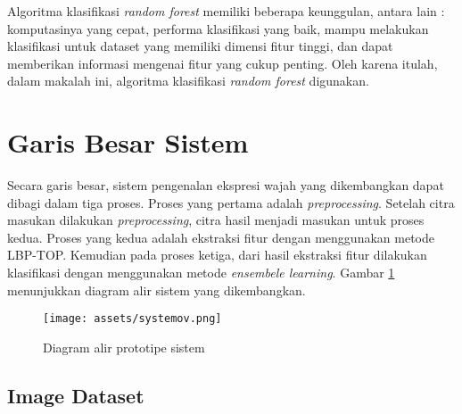 \documentclass[review,3p,12pt,times]{elsarticle}
\begin{document}
Algoritma klasifikasi \textit{random forest} memiliki beberapa keunggulan, antara lain \cite{breimanonline}: komputasinya yang cepat, performa klasifikasi yang baik, mampu melakukan klasifikasi untuk dataset yang memiliki dimensi fitur tinggi,
dan dapat memberikan informasi mengenai fitur yang cukup penting. Oleh karena itulah, dalam makalah ini, algoritma klasifikasi \textit{random forest} digunakan.




\section{Garis Besar Sistem}
\label{bigsystem}

Secara garis besar, sistem pengenalan ekspresi wajah yang dikembangkan dapat dibagi dalam tiga proses. Proses yang pertama adalah \textit{preprocessing}. Setelah citra masukan dilakukan \textit{preprocessing}, citra hasil menjadi masukan untuk proses kedua. Proses yang kedua adalah ekstraksi fitur dengan menggunakan metode LBP-TOP. Kemudian pada proses ketiga, dari hasil ekstraksi fitur dilakukan klasifikasi dengan menggunakan metode \textit{ensembele learning}. Gambar \ref{fig:systemov} menunjukkan diagram alir sistem yang dikembangkan.

\begin{figure}[hbt!]
\caption{Diagram alir prototipe sistem}
\label{fig:systemov}
\centering
	\texttt{[image: assets/systemov.png]}
	
\end{figure}

\subsection{Image Dataset}
\label{imagedataset}
\end{document}
